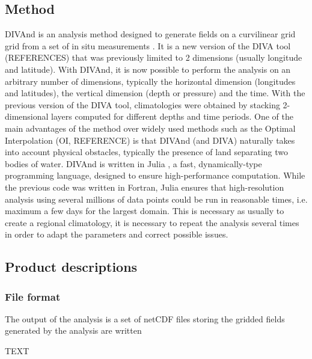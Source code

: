 \documentclass[essd, manuscript]{copernicus}
\begin{document}
\subsection{Method}

DIVAnd is an analysis method designed to generate fields on a curvilinear grid grid from a set of in situ measurements \citep{BARTH2014}. It is a new version of the DIVA tool (REFERENCES) that was previously limited to 2 dimensions (usually longitude and latitude). With DIVAnd, it is now possible to perform the analysis on an arbitrary number of dimensions, typically the horizontal dimension (longitudes and latitudes), the vertical dimension (depth or pressure) and the time. With the previous version of  the DIVA tool, climatologies were obtained by stacking 2-dimensional layers computed for different depths and time periods. 
One of the main advantages of the method over widely used methods such as the Optimal Interpolation (OI, REFERENCE) is that DIVAnd (and DIVA) naturally takes into account physical obstacles, typically the presence of land separating two bodies of water.  
DIVAnd is written in Julia \citep[][\url{https://julialang.org/}]{Julia-2017}, a fast, dynamically-type programming language, designed to ensure high-performance computation. While the previous code was written in Fortran, Julia ensures that high-resolution analysis using several millions of data points could be run in reasonable times, i.e. maximum a few days for the largest domain. This is necessary as usually to create a regional climatology, it is necessary to repeat the analysis several times in order to adapt the parameters and correct possible issues.

\subsection{Product descriptions}

\subsubsection{File format}

The output of the analysis is a set of netCDF files storing the gridded fields generated by the analysis are written 


\conclusions  %
TEXT

\end{document}
